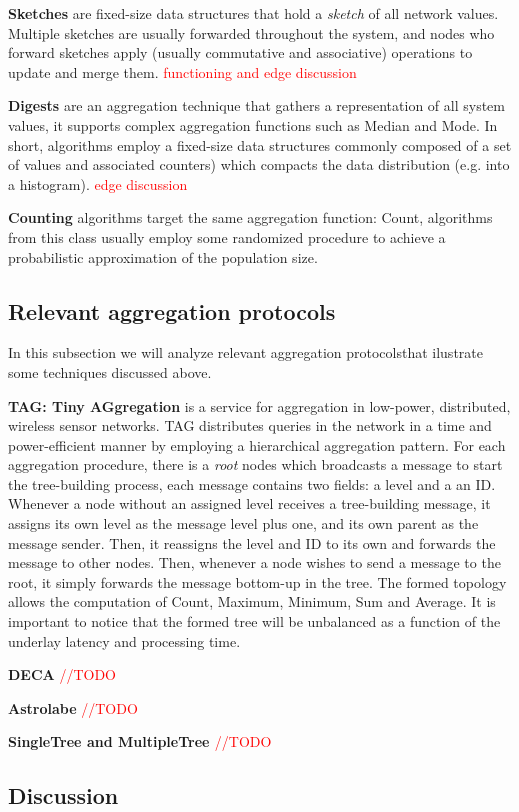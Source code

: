 \textbf{Sketches} are fixed-size data structures that hold a \textit{sketch} of all network values. Multiple sketches are usually forwarded throughout the system, and nodes who forward sketches apply (usually commutative and associative) operations to update and merge them. \textcolor{red}{functioning and edge discussion}


\textbf{Digests} are an aggregation technique that gathers a representation of all system values, it supports complex aggregation functions such as Median and Mode. In short, algorithms employ a fixed-size data structures commonly composed of a set of values and associated counters) which compacts the data distribution (e.g. into a histogram). \textcolor{red}{edge discussion}

\textbf{Counting} algorithms target the same aggregation function: Count, algorithms from this class usually employ some randomized procedure to achieve a probabilistic approximation of the population size.

\subsection{Relevant aggregation protocols}

In this subsection we will analyze relevant aggregation protocolsthat ilustrate some techniques discussed above.

\textbf{TAG: Tiny AGgregation}\cite{Madden2002} is a service for aggregation in low-power, distributed, wireless sensor networks. TAG distributes queries in the network in a time and power-efficient manner by employing a hierarchical aggregation pattern. For each aggregation procedure, there is a \textit{root} nodes which broadcasts a message to start the tree-building process, each message contains two fields: a level and a an ID. Whenever a node without an assigned level receives a tree-building message, it assigns its own level as the message level plus one, and its own parent as the message sender. Then, it reassigns the level and ID to its own and forwards the message to other nodes. Then, whenever a node wishes to send a message to the root, it simply forwards the message bottom-up in the tree. The formed topology allows the computation of Count, Maximum, Minimum, Sum and Average. It is important to notice that the formed tree will be unbalanced as a function of the underlay latency and processing time.

\textbf{DECA} \cite{Artigas2006} \textcolor{red}{//TODO}

\textbf{Astrolabe} \cite{Renesse2003} \textcolor{red}{//TODO}

\textbf{SingleTree \cite{} and MultipleTree \cite{}} \textcolor{red}{//TODO}



\subsection{Discussion}